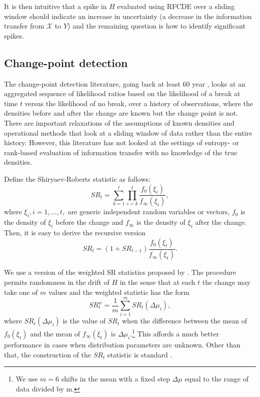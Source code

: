 It is then intuitive that a spike in $H$ evaluated using RFCDE over a sliding window should indicate an increase in uncertainty (a decrease in the information transfer from $\mathcal{X}$ to $Y$) and the remaining question is how to identify significant spikes. 


\subsection{Change-point detection}

The change-point detection literature, going back at least 60 year \citep{shiryaev:61, Shiryaev, Roberts}, looks at an aggregated sequence of likelihood ratios based on the likelihood of a break at time $t$ versus the likelihood of no break, over a history of observations, where the densities before and after the change are known but the change point is not. There are important relaxations of the assumptions of known densities and operational methods that look at a sliding window of data rather than the entire history. However, this literature has not looked at the settings of entropy- or rank-based evaluation of information transfer with no knowledge of the true densities.     

Define the Shiryaev-Roberts statistic as follows:
\begin{equation}
    SR_t = \sum\limits_{k=1}^{t}\prod\limits_{i=k}^{t}\dfrac{f_{0}(\xi_i)}{f_{\infty}(\xi_i)},
\end{equation}
where $\xi_i, i=1,\ldots, t,$ are generic independent random variables or vectors, $f_0$ is the density of $\xi_i$ before the change and $f_\infty$ is the density of $\xi_i$ after the change. Then, it is easy to derive the recursive version
\begin{equation}
    SR_t = (1+SR_{t-1})\frac{f_0(\xi_t)}{f_{\infty}(\xi_t)}.
\end{equation} 

We use a version of  the weighted SR statistics proposed by \cite{Tartakovsky}. The procedure permits randomness in the drift of $H$ in the sense that at each $t$ the change may take one of $m$ values and the weighted statistic has the form
\begin{equation}
        SR_t^{w} = \frac{1}{m}\sum\limits_{i=1}^{m}  SR_t(\Delta\mu_i),
\end{equation}
where  $SR_t(\Delta\mu_i)$ is the value of $SR_t$ when the difference between the mean of $f_0(\xi_t)$ and the mean of $f_\infty(\xi_t)$ is $\Delta\mu_i$.\footnote{We use $m=6$  shifts in the mean with a fixed step $\Delta \mu$ equal to the range of data divided by m.} This affords a much better performance in cases when distribution  parameters are unknown. Other than that, the construction of the $SR_t$ statistic is standard \cite[see, e.g.,][]{pepelyshev/poluchenko}. 


